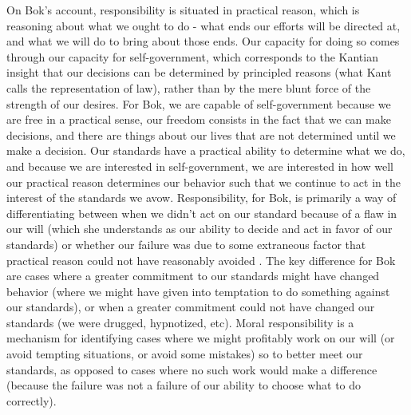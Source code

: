 \documentclass[phd,12pt,oneside,paper=letterpaper]{ubcthesis}
\begin{document}
On Bok's account, responsibility is situated in practical reason, which is reasoning about what we ought to do - what ends our efforts will be directed at, and what we will do to bring about those ends. Our capacity for doing so comes through our capacity for self-government, which corresponds to the Kantian insight that our decisions can be determined by principled reasons (what Kant calls the representation of law), rather than by the mere blunt force of the strength of our desires. For Bok, we are capable of self-government because we are free in a practical sense, our freedom consists in the fact that we can make decisions, and there are things about our lives that are not determined until we make a decision. Our standards have a practical ability to determine what we do, and because we are interested in self-government, we are interested in how well our practical reason determines our behavior such that we continue to act in the interest of the standards we avow. Responsibility, for Bok, is primarily a way of differentiating between when we didn't act on our standard because of a flaw in our will (which she understands as our ability to decide and act in favor of our standards) or whether our failure was due to some extraneous factor that practical reason could not have reasonably avoided \citep{bok1998}. The key difference for Bok are cases where a greater commitment to our standards might have changed behavior (where we might have given into temptation to do something against our standards), or when a greater commitment could not have changed our standards (we were drugged, hypnotized, etc). Moral responsibility is a mechanism for identifying cases where we might profitably work on our will (or avoid tempting situations, or avoid some mistakes) so to better meet our standards, as opposed to cases where no such work would make a difference (because the failure was not a failure of our ability to choose what to do correctly). 
\end{document}
